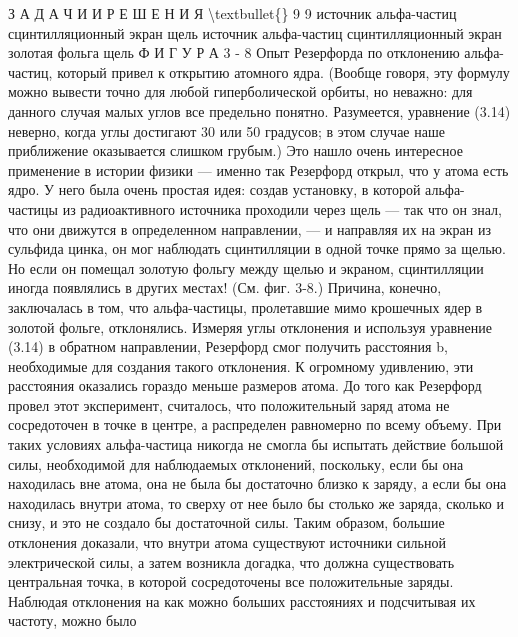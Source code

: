 \documentclass[10pt,oneside]{article}
\begin{document}
З А Д А Ч И  И  Р Е Ш Е Н И Я \textbackslash{}textbullet\{\} 9 9 источник альфа-частиц сцинтилляционный экран щель источник альфа-частиц сцинтилляционный экран золотая фольга щель Ф И Г У Р А  3 - 8 Опыт Резерфорда по отклонению альфа-частиц, который привел к открытию атомного ядра. (Вообще говоря, эту формулу можно вывести точно для любой гиперболической орбиты, но неважно: для данного случая малых углов все предельно понятно. Разумеется, уравнение (3.14) неверно, когда углы достигают 30 или 50 градусов; в этом случае наше приближение оказывается слишком грубым.) Это нашло очень интересное применение в истории физики --- именно так Резерфорд открыл, что у атома есть ядро. У него была очень простая идея: создав установку, в которой альфа-частицы из радиоактивного источника проходили через щель --- так что он знал, что они движутся в определенном направлении, --- и направляя их на экран из сульфида цинка, он мог наблюдать сцинтилляции в одной точке прямо за щелью. Но если он помещал золотую фольгу между щелью и экраном, сцинтилляции иногда появлялись в других местах! (См. фиг. 3-8.) Причина, конечно, заключалась в том, что альфа-частицы, пролетавшие мимо крошечных ядер в золотой фольге, отклонялись. Измеряя углы отклонения и используя уравнение (3.14) в обратном направлении, Резерфорд смог получить расстояния b, необходимые для создания такого отклонения. К огромному удивлению, эти расстояния оказались гораздо меньше размеров атома. До того как Резерфорд провел этот эксперимент, считалось, что положительный заряд атома не сосредоточен в точке в центре, а распределен равномерно по всему объему. При таких условиях альфа-частица никогда не смогла бы испытать действие большой силы, необходимой для наблюдаемых отклонений, поскольку, если бы она находилась вне атома, она не была бы достаточно близко к заряду, а если бы она находилась внутри атома, то сверху от нее было бы столько же заряда, сколько и снизу, и это не создало бы достаточной силы. Таким образом, большие отклонения доказали, что внутри атома существуют источники сильной электрической силы, а затем возникла догадка, что должна существовать центральная точка, в которой сосредоточены все положительные заряды. Наблюдая отклонения на как можно больших расстояниях и подсчитывая их частоту, можно было\par
\end{document}
